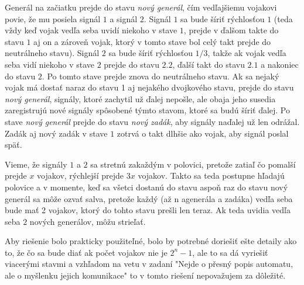 
Generál na začiatku prejde do stavu \textit{nový generál}, čím 
vedľajšiemu vojakovi povie, že mu posiela signál $1$ a signál $2$. 
Signál $1$ sa bude šíriť rýchlosťou $1$ (teda vždy keď vojak vedľa seba 
uvidí niekoho v stave $1$, prejde v ďalšom takte do stavu $1$ aj on a 
zároveň vojak, ktorý v tomto stave bol celý takt prejde do neutrálneho 
stavu). Signál $2$ sa bude šíriť rýchlosťou $1/3$, takže ak vojak vedľa seba vidí niekoho 
v stave $2$ prejde do stavu $2.2$, ďalší takt do stavu $2.1$ a nakoniec 
do stavu $2$. Po tomto stave prejde znova do neutrálneho stavu. Ak sa 
nejaký vojak má dostať naraz do stavu 1 aj nejakého dvojkového stavu, 
prejde do stavu \textit{nový generál}, signály, ktoré zachytil už 
ďalej nepošle, ale obaja jeho susedia zaregistrujú nové signály 
spôsobené týmto stavom, ktoré sa budú šíriť ďalej. Po stave 
\textit{nový generál} prejde do stavu \textit{nový zadák}, aby signály 
naďalej už len odrážal. Zadák aj nový zadák v stave $1$ zotrvá o takt 
dlhšie ako vojak, aby signál poslal späť.

Vieme, že signály $1$ a $2$ sa stretnú zakaždým v polovici, pretože 
zatiaľ čo pomalší prejde $x$ vojakov, rýchlejší prejde $3x$ vojakov. 
Takto sa teda postupne hľadajú polovice a v momente, keď sa všetci 
dostanú do stavu aspoň raz do stavu nový generál sa môže ozvať salva, 
pretože každý (až n agenerála a zadáka) vedľa seba bude mať 2 vojakov, 
ktorý do tohto stavu prešli len teraz. Ak teda uvidia vedľa seba $2$ 
nových generálov, môžu strieľať. 

Aby riešenie bolo prakticky použiteľné, bolo by potrebné doriešiť ešte 
detaily ako to, že čo sa bude diať ak počet vojakov nie je $2^n-1$, ale 
to sa dá vyriešiť viacerými stavmi a vzhľadom na vetu v zadaní "Nejde 
o přesný popis automatu, ale o myšlenku jejich komunikace" to v tomto 
riešení nepovažujem za dôležité. 

